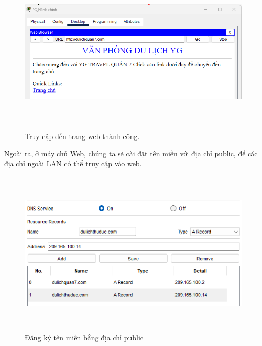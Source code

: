 \documentclass[a4paper, 12pt]{article}
\begin{document}
\begin{figure}[H]
    \centering
    \includegraphics[width=16cm, height=8cm]{img/4.2.1d.png}
    \caption{Truy cập đến trang web thành công.}
    \label{hinh421d}
\end{figure}
\hspace*{0.25cm}Ngoài ra, ở máy chủ Web, chúng ta sẽ cài đặt tên miền với địa chỉ public, để các địa chỉ ngoài LAN có thể truy cập vào web.\\
\begin{figure}[H]
    \centering
    \includegraphics[width=16cm, height=8cm]{img/4.4.2d.png}
    \caption{Đăng ký tên miền bằng địa chỉ public }
    \label{hinh441a}
\end{figure}
\end{document}
